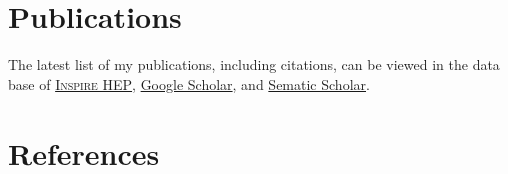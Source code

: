 \documentclass[12pt]{article}
\begin{document}
\section*{Publications}
The latest list of my publications, including citations, can be viewed in the data base of
\href{https://inspirehep.net/authors/1618109}{\textsc{Inspire HEP}}, 
\href{https://scholar.google.com/citations?user=SFL0gZMAAAAJ&hl=en}{Google Scholar},
and \href{https://www.semanticscholar.org/author/K.-Xie/2024153229}{Sematic Scholar}.
\vspace{-40pt}
\nocite{*}
%

%


\newpage
\section*{References}
\end{document}
